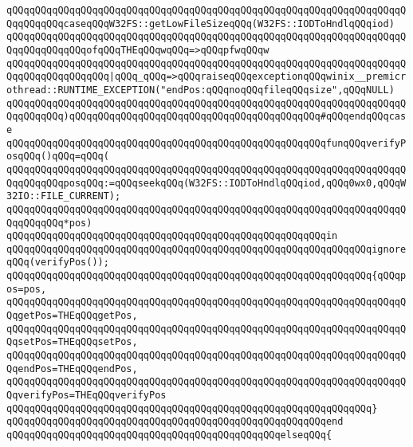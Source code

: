 \verb|qQQqqQQqqQQqqQQqqQQqqQQqqQQqqQQqqQQqqQQqqQQqqQQqqQQqqQQqqQQqqQQqqQQqqQQqqQQqqQQqcaseqQQqW32FS::getLowFileSizeqQQq(W32FS::IODToHndlqQQqiod)|\newline
\verb|qQQqqQQqqQQqqQQqqQQqqQQqqQQqqQQqqQQqqQQqqQQqqQQqqQQqqQQqqQQqqQQqqQQqqQQqqQQqqQQqqQQqofqQQqTHEqQQqwqQQq=>qQQqpfwqQQqw|\newline
\verb|qQQqqQQqqQQqqQQqqQQqqQQqqQQqqQQqqQQqqQQqqQQqqQQqqQQqqQQqqQQqqQQqqQQqqQQqqQQqqQQqqQQqqQQq|\verb#|qQQq_qQQq=>qQQqraiseqQQqexceptionqQQqwinix__premicrothread::RUNTIME_EXCEPTION("endPos:qQQqnoqQQqfileqQQqsize",qQQqNULL)#\newline
\verb|qQQqqQQqqQQqqQQqqQQqqQQqqQQqqQQqqQQqqQQqqQQqqQQqqQQqqQQqqQQqqQQqqQQqqQQqqQQqqQQq)qQQqqQQqqQQqqQQqqQQqqQQqqQQqqQQqqQQqqQQqqQQq#qQQqendqQQqcase|\newline
\verb|qQQqqQQqqQQqqQQqqQQqqQQqqQQqqQQqqQQqqQQqqQQqqQQqqQQqqQQqfunqQQqverifyPosqQQq()qQQq=qQQq(|\newline
\verb|qQQqqQQqqQQqqQQqqQQqqQQqqQQqqQQqqQQqqQQqqQQqqQQqqQQqqQQqqQQqqQQqqQQqqQQqqQQqqQQqposqQQq:=qQQqseekqQQq(W32FS::IODToHndlqQQqiod,qQQq0wx0,qQQqW32IO::FILE_CURRENT);|\newline
\verb|qQQqqQQqqQQqqQQqqQQqqQQqqQQqqQQqqQQqqQQqqQQqqQQqqQQqqQQqqQQqqQQqqQQqqQQqqQQqqQQq*pos)|\newline
\verb|qQQqqQQqqQQqqQQqqQQqqQQqqQQqqQQqqQQqqQQqqQQqqQQqqQQqqQQqin|\newline
\verb|qQQqqQQqqQQqqQQqqQQqqQQqqQQqqQQqqQQqqQQqqQQqqQQqqQQqqQQqqQQqqQQqignoreqQQq(verifyPos());|\newline
\verb|qQQqqQQqqQQqqQQqqQQqqQQqqQQqqQQqqQQqqQQqqQQqqQQqqQQqqQQqqQQqqQQq{qQQqpos=pos,|\newline
\verb|qQQqqQQqqQQqqQQqqQQqqQQqqQQqqQQqqQQqqQQqqQQqqQQqqQQqqQQqqQQqqQQqqQQqqQQqgetPos=THEqQQqgetPos,|\newline
\verb|qQQqqQQqqQQqqQQqqQQqqQQqqQQqqQQqqQQqqQQqqQQqqQQqqQQqqQQqqQQqqQQqqQQqqQQqsetPos=THEqQQqsetPos,|\newline
\verb|qQQqqQQqqQQqqQQqqQQqqQQqqQQqqQQqqQQqqQQqqQQqqQQqqQQqqQQqqQQqqQQqqQQqqQQqendPos=THEqQQqendPos,|\newline
\verb|qQQqqQQqqQQqqQQqqQQqqQQqqQQqqQQqqQQqqQQqqQQqqQQqqQQqqQQqqQQqqQQqqQQqqQQqverifyPos=THEqQQqverifyPos|\newline
\verb|qQQqqQQqqQQqqQQqqQQqqQQqqQQqqQQqqQQqqQQqqQQqqQQqqQQqqQQqqQQqqQQq}|\newline
\verb|qQQqqQQqqQQqqQQqqQQqqQQqqQQqqQQqqQQqqQQqqQQqqQQqqQQqqQQqend|\newline
\verb|qQQqqQQqqQQqqQQqqQQqqQQqqQQqqQQqqQQqqQQqqQQqqQQqelseqQQq{|\newline
